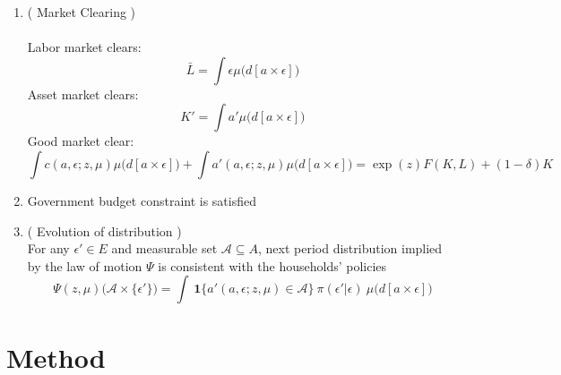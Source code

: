 \documentclass[a4paper,10pt]{article}  %
\begin{document}
\begin{enumerate}
   \item ( Market Clearing ) \\~\\
         Labor market clears:
         \begin{equation}
            \label{eq:labor_mkt}
            \bar{L} = \int \epsilon \mu\big( d[a\times \epsilon] \big)
         \end{equation}
         Asset market clears:
         \begin{equation}
            \label{eq:asset_mkt}
            K' = \int a' \mu\big( d[a\times \epsilon] \big)
         \end{equation}
         Good market clear:
         \begin{equation}
            \label{eq:asset_mkt}
            \int c( a, \epsilon ; z, \mu) \mu\big( d[a\times \epsilon] \big) + \int a'( a,\epsilon ; z, \mu) \mu\big( d[a\times \epsilon] \big)
            = \exp{( z )} F( K,L ) + ( 1- \delta ) K
         \end{equation}
   \item Government budget constraint is satisfied

   \item ( Evolution of distribution ) \\
         For any $ \epsilon' \in E $ and measurable set $ \mathcal{A} \subseteq A $, next period distribution implied by the
         law of motion $ \Psi $ is consistent with the households' policies
         \begin{equation}
            \label{eq:law_of_motion}
            \Psi( z, \mu ) \Big( \mathcal{A} \times \{\epsilon'\} \Big) = \int
            \ \mathbf{1} \Big\{  a'( a, \epsilon; z, \mu ) \in \mathcal{A} \Big\} \ \pi( \epsilon' | \epsilon ) \ \mu\big( d[a\times\epsilon] \big)
         \end{equation}
\end{enumerate}


\newpage
\section{Method} %
\label{sec:method}
\end{document}
